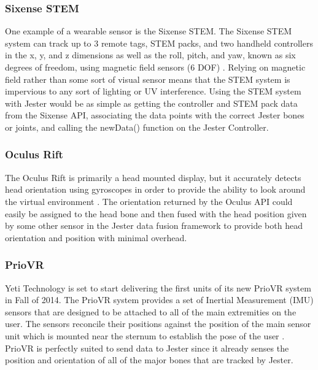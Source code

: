 \subsubsection{Sixense STEM}\label{sec:sixense}

One example of a wearable sensor is the Sixense STEM. The Sixense STEM system can track up to 3 remote tags, STEM packs, and two handheld controllers in the x, y, and z dimensions as well as the roll, pitch, and yaw, known as six degrees of freedom, using magnetic field sensors (6 DOF) \cite{sixense_stem}. Relying on magnetic field rather than some sort of visual sensor means that the STEM system is impervious to any sort of lighting or UV interference. Using the STEM system with Jester would be as simple as getting the controller and STEM pack data from the Sixense API, associating the data points with the correct Jester bones or joints, and calling the newData() function on the Jester Controller.

\subsubsection{Oculus Rift}\label{sec:oculus}

The Oculus Rift is primarily a head mounted display, but it accurately detects head orientation using gyroscopes in order to provide the ability to look around the virtual environment \cite{oculus2012oculus}. The orientation returned by the Oculus API could easily be assigned to the head bone and then fused with the head position given by some other sensor in the Jester data fusion framework to provide both head orientation and position with minimal overhead.

\subsubsection{PrioVR}\label{sec:prio}

Yeti Technology is set to start delivering the first units of its new PrioVR system in Fall of 2014. The PrioVR system provides a set of Inertial Measurement (IMU) sensors that are designed to be attached to all of the main extremities on the user. The sensors reconcile their positions against the position of the main sensor unit which is mounted near the sternum to establish the pose of the user \cite{priovr}. PrioVR is perfectly suited to send data to Jester since it already senses the position and orientation of all of the major bones that are tracked by Jester.


